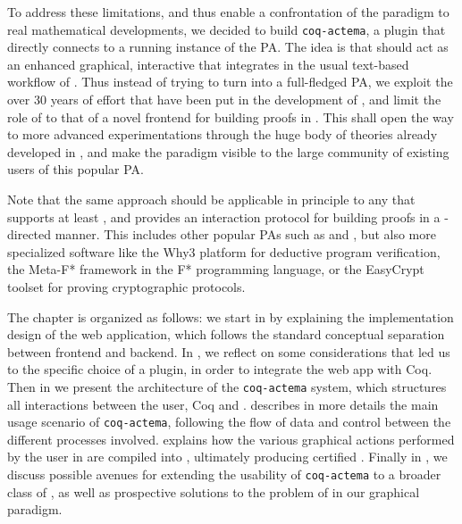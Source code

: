 To address these limitations, and thus enable a confrontation of the
 paradigm to real mathematical developments, we decided to build
\texttt{coq-actema}, a  plugin that directly connects  to a running
instance of the  PA. The idea is that  should act as an enhanced
graphical, interactive  that integrates in the usual text-based
workflow of . Thus instead of trying to turn  into a
full-fledged PA, we exploit the over 30 years of effort that have been put in
the development of , and limit the role of  to that of a novel frontend
for building proofs in . This shall open the way to more advanced
experimentations through the huge body of theories already developed in , and
make the  paradigm visible to the large community of existing
users of this popular PA.

Note that the same approach should be applicable in principle to any  that
supports at least , and provides an interaction protocol for building proofs
in a -directed manner. This includes other popular PAs such as  and
, but also more specialized software like the Why3 platform for
deductive program verification, the Meta-F* framework in the F* programming
language, or the EasyCrypt toolset for proving cryptographic protocols.


The chapter is organized as follows: we start in  by explaining
the implementation design of the  web application, which follows the
standard conceptual separation between frontend and backend. In
, we reflect on some considerations that led us to the
specific choice of a  plugin, in order to integrate the  web app with
Coq. Then in  we present the architecture of the
\texttt{coq-actema} system, which structures all interactions between the user,
Coq and .  describes in more details the main usage
scenario of \texttt{coq-actema}, following the flow of data and control between
the different processes involved.  explains how the various
graphical actions performed by the user in  are compiled into  ,
ultimately producing certified . Finally in , we
discuss possible avenues for extending the usability of \texttt{coq-actema} to a
broader class of  , as well as prospective solutions to the problem of
 in our graphical paradigm.


